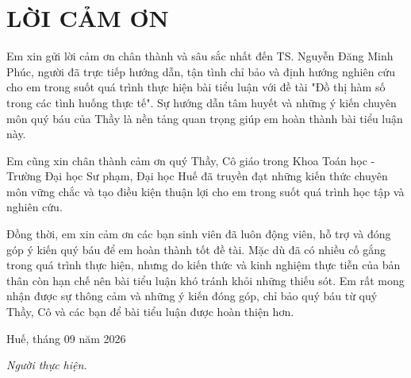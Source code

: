\documentclass[12pt,a4paper,oneside]{book}
\theoremstyle{theorem}
\theoremstyle{definition}
\begin{document}
	
	
	\newpage
	\newpage
	\def\@chapter[#1]#2{\ifnum \c@secnumdepth >\m@ne
		\if@mainmatter
		\refstepcounter{chapter}%
		\typeout{\@chapapp\space\thechapter.}%
		\addcontentsline{toc}{chapter}%
		{\bf  Chương \protect\numberline{\thechapter. } #1}%
		\else
		\addcontentsline{toc}{chapter}{ #1}%
		\fi
		\else
		\addcontentsline{toc}{chapter}{ #1}%
		\fi
		\chaptermark{#1}%
		\addtocontents{lof}{\protect\addvspace{10\p@}}%
		\addtocontents{lot}{\protect\addvspace{10\p@}}%
		\if@twocolumn
		\@topnewpage[\@makechapterhead{#2}]%
		\else
		\@makechapterhead{#2}%
		\@afterheading
		\fi}
	\tableofcontents
	\pagestyle{plain}
	\chapter*{LỜI CẢM ƠN}
	\fontsize{13pt}{22pt} \selectfont
        Em xin gửi lời cảm ơn chân thành và sâu sắc nhất đến TS. Nguyễn Đăng Minh Phúc, người đã trực tiếp hướng dẫn, tận tình chỉ bảo và định hướng nghiên cứu cho em trong suốt quá trình thực hiện bài tiểu luận với đề tài "Đồ thị hàm số trong các tình huống thực tế". Sự hướng dẫn tâm huyết và những ý kiến chuyên môn quý báu của Thầy là nền tảng quan trọng giúp em hoàn thành bài tiểu luận này.  
        
        Em cũng xin chân thành cảm ơn quý Thầy, Cô giáo trong Khoa Toán học - Trường Đại học Sư phạm, Đại học Huế đã truyền đạt những kiến thức chuyên môn vững chắc và tạo điều kiện thuận lợi cho em trong suốt quá trình học tập và nghiên cứu.  
        
        Đồng thời, em xin cảm ơn các bạn sinh viên đã luôn động viên, hỗ trợ và đóng góp ý kiến quý báu để em hoàn thành tốt đề tài. Mặc dù đã có nhiều cố gắng trong quá trình thực hiện, nhưng do kiến thức và kinh nghiệm thực tiễn của bản thân còn hạn chế nên bài tiểu luận khó tránh khỏi những thiếu sót. Em rất mong nhận được sự thông cảm và những ý kiến đóng góp, chỉ bảo quý báu từ quý Thầy, Cô và các bạn để bài tiểu luận được hoàn thiện hơn.
	
	\begin{flushright}
		Huế, tháng 09 năm 2026
		
		\textit{Người thực hiện.}
	\end{flushright}
	
\end{document}
